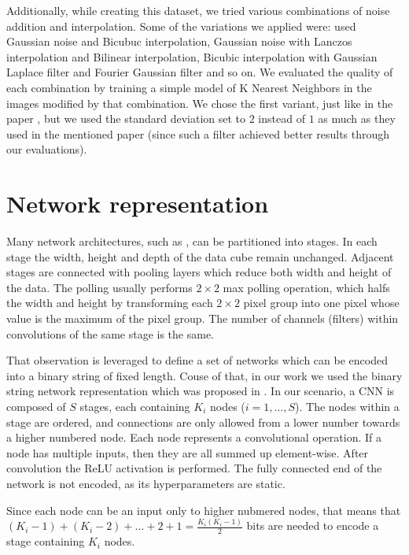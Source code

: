\documentclass[eng]{simposium}
\begin{document}
Additionally, while creating this dataset, we tried various combinations of noise addition and interpolation. 
Some of the variations we applied were: used Gaussian noise and Bicubuc interpolation, Gaussian noise with Lanczos interpolation 
and Bilinear interpolation, Bicubic interpolation with Gaussian Laplace filter and Fourier Gaussian filter and so on. 
We evaluated the quality of each combination by training a simple model of K Nearest Neighbors in the images modified by that 
combination. We chose the first variant, just like in the paper \cite{1}, but we used the standard deviation set to $2$ 
instead of $1$ as much as they used in the mentioned paper (since such a filter achieved better results through our evaluations). 

\section{Network representation}
\label{sec:repr}

Many network architectures, such as \cite{6,7}, can be partitioned into stages.
In each stage the width, height and depth of the data cube remain unchanged. 
Adjacent stages are connected with pooling layers which reduce both width and height of the data.
The polling usually performs $2 \times 2$ max polling operation, which halfs the width and height by transforming each $2 \times 2$ 
pixel group into one pixel whose value is the maximum of the pixel group.
The number of channels (filters) within convolutions of the same stage is the same.

That observation is leveraged to define a set of networks which 
can be encoded into a binary string of fixed length. 
Couse of that, in our work we used the binary string network representation which was proposed in \cite{4}. 
In our scenario, a CNN is composed of $S$ stages, each containing 
$K_i$ nodes ($i=1,...,S$). 
The nodes within a stage are ordered, and connections are only allowed from a lower number towards a higher numbered node.
Each node represents a convolutional operation. If a node has multiple inputs, then they are all summed up element-wise.
After convolution the ReLU activation is performed. 
The fully connected end of the network is not encoded, as its hyperparameters are static. 

Since each node can be an input only to higher nubmered nodes, that means that 
$(K_i -1) + (K_i - 2) + ... + 2 + 1 = \frac{K_i(K_i-1)}{2}$ bits are needed to encode a stage containing $K_i$ nodes.
\end{document}
